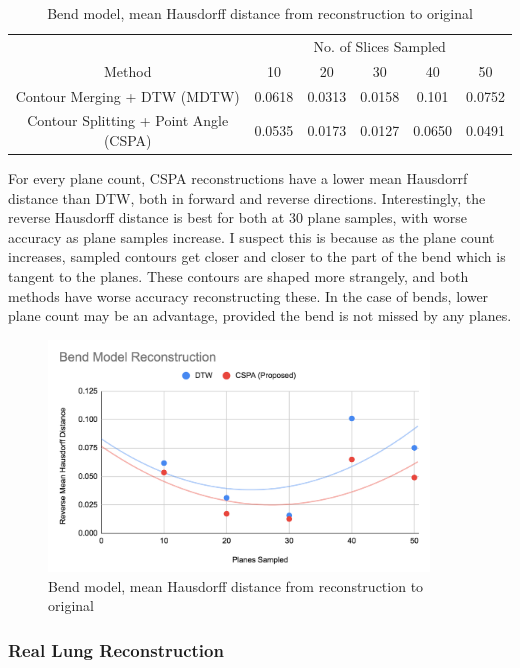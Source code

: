 \documentclass[11p, titlepage]{article}
\begin{document}
\begin{table}[h!]
\begin{tabular}{ | c | c | c | c | c | c | }
\hline
& \multicolumn{5}{c|}{No. of Slices Sampled} \\
\cline{2-6}
Method & 10 & 20 & 30 & 40 & 50 \\
\hline
Contour Merging + DTW (MDTW) & 0.0618 & 0.0313 & 0.0158 & 0.101 & 0.0752 \\
Contour Splitting + Point Angle (CSPA) & 0.0535 & 0.0173 & 0.0127 & 0.0650 & 0.0491 \\
\hline
\end{tabular}
\caption{Bend model, mean Hausdorff distance from reconstruction to original}
\label{table:bend_reverse}
\end{table}

For every plane count, CSPA reconstructions have a lower mean Hausdorrf distance than DTW, both in forward and reverse directions. Interestingly, the reverse Hausdorff distance is best for both at 30 plane samples, with worse accuracy as plane samples increase. I suspect this is because as the plane count increases, sampled contours get closer and closer to the part of the bend which is tangent to the planes. These contours are shaped more strangely, and both methods have worse accuracy reconstructing these. In the case of bends, lower plane count may be an advantage, provided the bend is not missed by any planes.

\begin{figure}[h!]
\centering
\includegraphics[width=0.9\textwidth]{graphs/bend-reverse}
\caption{Bend model, mean Hausdorff distance from reconstruction to original\label{fig:bend_reverse_graph}}
\end{figure}
\pagebreak

\subsubsection{Real Lung Reconstruction}
\end{document}
